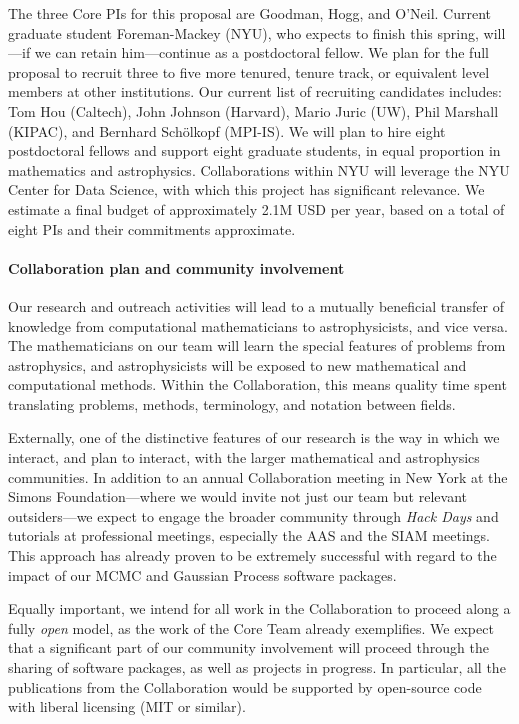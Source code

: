 \documentclass[12pt]{article}
\begin{document}
The three Core PIs for this proposal are Goodman, Hogg, and O'Neil.
Current graduate student Foreman-Mackey (NYU), who expects to finish
this spring, will---if we can retain him---continue as a postdoctoral
fellow.
We plan for the full proposal to recruit three to five more tenured,
tenure track, or equivalent level members at other institutions.  Our
current list of recruiting candidates includes: Tom Hou (Caltech), John
Johnson (Harvard), Mario Juric (UW), Phil Marshall (KIPAC), and Bernhard
Sch\"olkopf (MPI-IS).
We will plan to hire eight postdoctoral fellows and support eight
graduate students, in equal proportion in mathematics and astrophysics.
Collaborations within NYU will leverage the NYU Center for Data Science,
with which this project has significant relevance.
We estimate a final budget of approximately 2.1M USD per year,
based on a total of eight PIs and their commitments approximate.

\paragraph{Collaboration plan and community involvement}

Our research and outreach activities will lead to a mutually beneficial
transfer of knowledge from computational mathematicians to
astrophysicists, and vice versa.
The mathematicians on our team will learn the special features of
problems from astrophysics, and astrophysicists will be exposed to new
mathematical and computational methods.
Within the Collaboration, this means quality time spent translating
problems, methods, terminology, and notation between fields.

Externally, one of the distinctive features of our research is the way
in which we interact, and plan to interact, with the larger mathematical
and astrophysics communities.
In addition to an annual Collaboration meeting in New York at the Simons
Foundation---where we would invite not just our team but relevant
outsiders---we expect to engage the broader community through \emph{Hack
Days} and tutorials at professional meetings, especially the AAS and the SIAM meetings.
This approach has already proven to be extremely successful with regard
to the impact of our MCMC and Gaussian Process software packages.

Equally important, we intend for all work in the Collaboration to
proceed along a fully \emph{open} model, as the work of the Core Team
already exemplifies.
We expect that a significant part of our community involvement will
proceed through the sharing of software packages, as well as projects in
progress.
In particular, all the publications from the Collaboration would be
supported by open-source code with liberal licensing (MIT or similar).
\end{document}
